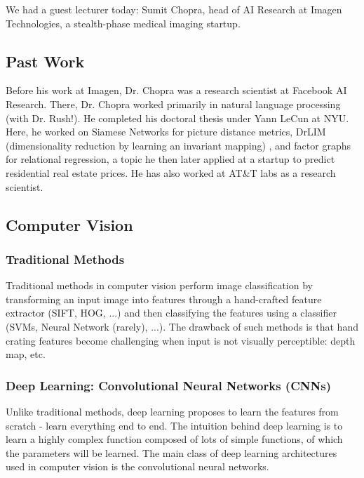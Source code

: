 \documentclass{article}
\begin{document}
We had a guest lecturer today: Sumit Chopra, head of AI Research at Imagen Technologies, a stealth-phase medical imaging startup.
\subsection{Past Work}
Before his work at Imagen, Dr. Chopra was a research scientist at Facebook AI Research. There, Dr. Chopra worked primarily in natural language processing (with Dr. Rush!). He completed his doctoral thesis under Yann LeCun at NYU. Here, he worked on Siamese Networks for picture distance metrics, DrLIM (dimensionality reduction by learning an invariant mapping) , and factor graphs for relational regression, a topic he then later applied at a startup to predict residential real estate prices. He has also worked at AT\&T labs as a research scientist.
\subsection{Computer Vision}

\subsubsection{Traditional Methods}
Traditional methods in computer vision perform image classification by transforming an input image into features through a hand-crafted feature extractor (SIFT, HOG, ...) and then classifying the features using a classifier (SVMs, Neural Network (rarely), ...). The drawback of such methods is that hand crating features become challenging when input is not visually perceptible: depth map, etc. 

\subsubsection{Deep Learning: Convolutional Neural Networks (CNNs)}

Unlike traditional methods, deep learning proposes to learn the features from scratch - learn everything end to end. The intuition behind deep learning is to learn a highly complex function composed of lots of simple functions, of which the parameters will be learned. The main class of deep learning architectures used in computer vision is the convolutional neural networks. 
\end{document}
